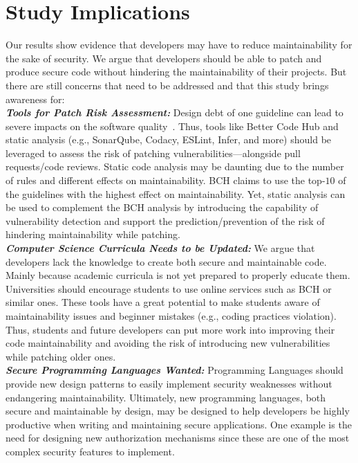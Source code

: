 \documentclass[10pt,conference]{IEEEtran}
\newcommand\Rui[1]{\nb{Rui}{blue}{#1}}
\begin{document}
\section{Study Implications}\label{sec:implications}
%
Our results show evidence that developers may have to reduce maintainability for the 
sake of security. We argue that developers should be able to patch and produce 
secure code without hindering the maintainability of their projects. But there are 
still concerns that need to be addressed and that this study brings awareness for:
%
\\\textit{\textbf{Tools for Patch Risk Assessment:}}
	Design debt of one guideline can lead
	to severe impacts on the software quality~\cite{10.1145/1985362.1985366}. 
	Thus, tools like Better Code Hub and static analysis (e.g., SonarQube, Codacy,
	ESLint, Infer, and more) should be leveraged to 
	assess the risk of patching vulnerabilities---alongside pull
  requests/code reviews. Static code analysis
	may be daunting due to the number of rules and different effects
	on maintainability. BCH claims to use the top-$10$ of the guidelines
	with the highest effect on maintainability. Yet, static analysis 
	can be used to complement the BCH analysis by introducing
	the capability of vulnerability detection and support the prediction/prevention of the risk of hindering maintainability while patching.
%
\\\textit{\textbf{Computer Science Curricula Needs to be Updated:}}
	We argue that developers lack the knowledge to create both secure and
	maintainable code. Mainly because academic curricula is not yet prepared
	to properly educate them. Universities should encourage students to use online 	services such as BCH or similar ones. These tools have a great potential to make
	students aware of maintainability issues and beginner mistakes (e.g.,
	coding practices violation). Thus, students and future developers can 
	put more work into improving their code maintainability and avoiding the risk
	of introducing new vulnerabilities while patching older ones.
%	
\\\textit{\textbf{Secure Programming Languages Wanted:}} Programming Languages 
	should provide new design patterns to easily implement security weaknesses 
	without endangering maintainability.
	Ultimately, new programming languages, both secure and maintainable by design,
	may be designed to help developers be highly productive when writing and
	maintaining secure applications. One example is the need for designing new
	authorization mechanisms since these are one of the most complex security
	features to implement.
% 
\end{document}
